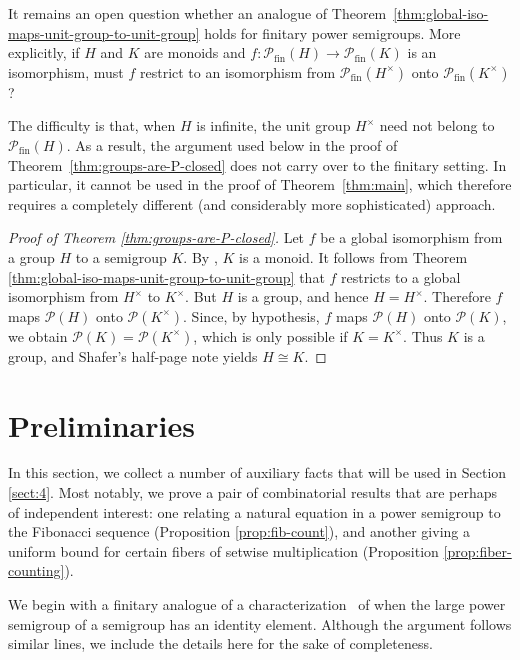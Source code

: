 \documentclass[11pt,reqno]{amsart}
\theoremstyle{definition}
\theoremstyle{remark}
\theoremstyle{theoremdd}
\newcommand{\fin}{\mathrm{fin}}
\renewcommand{\,}{\kern 0.1em}
\begin{document}
It remains an open question whether an analogue of Theorem~\ref{thm:global-iso-maps-unit-group-to-unit-group} holds for finitary power semigroups. More explicitly, if $H$ and $K$ are monoids and $f \colon \mathcal{P}_{\fin}(H) \to \mathcal{P}_{\fin}(K)$ is an isomorphism, must $f$ restrict to an isomorphism from $\mathcal{P}_{\fin}(H^\times)$ onto $\mathcal{P}_{\fin}(K^\times)$? 

The difficulty is that, when $H$ is infinite, the unit group $H^\times$ need not belong to $\mathcal P_{\fin}(H)$. As a result, the argument used below in the proof of Theorem~\ref{thm:groups-are-P-closed} does not carry over to the finitary
setting. In particular, it cannot be used in the proof of Theorem~\ref{thm:main}, which therefore requires a completely different
(and considerably more sophisticated) approach.



\begin{proof}[Proof of Theorem \ref{thm:groups-are-P-closed}]
Let $f$ be a global isomorphism from a group $H$ to a semigroup $K$. By \cite[Lemma 1.1]{Gou-Isk-Tsi-1984}, $K$ is a monoid. It follows from Theorem \ref{thm:global-iso-maps-unit-group-to-unit-group} that $f$ restricts to a global isomorphism from $H^\times$ to $K^\times$. 
But $H$ is a group, and hence $H=H^\times$. Therefore $f$ maps
$\mathcal P(H)$ onto $\mathcal P(K^\times)$. Since, by hypothesis,
$f$ maps $\mathcal P(H)$ onto $\mathcal P(K)$, we obtain $
\mathcal P(K)=\mathcal P(K^\times)$, which is only possible if $K=K^\times$. Thus $K$ is a group, and Shafer's half-page note \cite{Sha-1967} yields $H \cong K$.
\end{proof}


\section{Preliminaries}
\label{sec:preliminaries}

In this section, we collect a number of auxiliary facts that will be used in Section \ref{sect:4}. Most notably, we prove a pair of combinatorial results that are perhaps of independent interest: one relating a natural equation in a power semigroup to the Fibonacci sequence (Proposition \ref{prop:fib-count}), and another giving a uniform bound for certain fibers of setwise multiplication (Proposition \ref{prop:fiber-counting}).

We begin with a finitary analogue of a characterization~\cite[Lemma 1.1]{Gou-Isk-Tsi-1984} of when the large power semigroup of a semigroup has an identity element. Although the argument follows similar lines, we include the details here for the sake of completeness.
\end{document}
